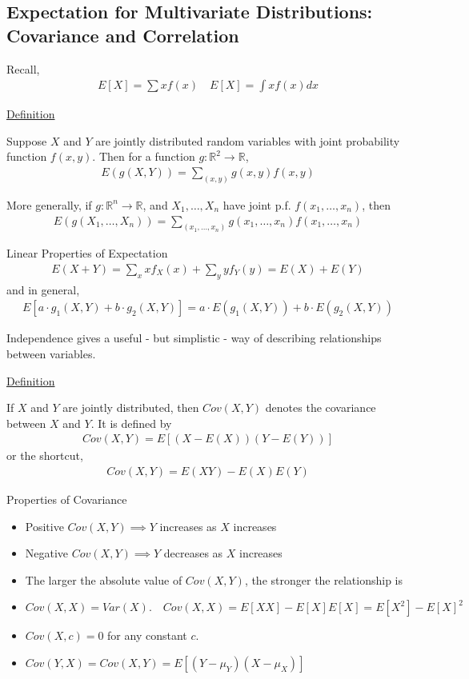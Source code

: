 \documentclass{article}
\begin{document}
\subsection{Expectation for Multivariate Distributions: Covariance and Correlation}

Recall,
\begin{align*}
    E[X] = \sum xf(x) \quad E[X] = \int xf(x)dx
\end{align*}

\underline{Definition}

Suppose $X$ and $Y$ are jointly distributed random variables with joint probability function $f(x,y)$. Then for a function $g: \mathbb{R}^2 \to \mathbb{R}$,
\begin{align*}
    E(g(X,Y)) = \sum_{(x,y)}g(x,y)f(x,y)
\end{align*}

More generally, if $g: \mathbb{R}^n \to \mathbb{R}$, and $X_1, \ldots, X_n$ have joint p.f. $f(x_1, \ldots, x_n)$, then
\begin{align*}
    E(g(X_1, \ldots, X_n)) = \sum_{(x_1, \ldots, x_n)} g(x_1, \ldots, x_n)f(x_1, \ldots, x_n)
\end{align*}


Linear Properties of Expectation
\begin{align*}
    E(X + Y) = \sum_{x}xf_X(x) + \sum_{y}yf_Y(y) = E(X) + E(Y)
\end{align*}
and in general, 
\begin{align*}
    E[a \cdot g_1(X,Y) + b \cdot g_2(X,Y)] = a \cdot E(g_1(X,Y)) + b \cdot E(g_2(X,Y))
\end{align*}

Independence gives a useful - but simplistic - way of describing relationships between variables. 

\underline{Definition}

If $X$ and $Y$ are jointly distributed, then $Cov(X,Y)$ denotes the covariance between $X$ and $Y$. It is defined by
\begin{align*}
    Cov(X,Y) = E[(X-E(X))(Y-E(Y))]
\end{align*}
or the shortcut,
\begin{align*}
    Cov(X,Y) = E(XY) - E(X)E(Y)
\end{align*}

Properties of Covariance
\begin{itemize}
    \item Positive $Cov(X,Y) \implies Y$ increases as $X$ increases
    \item Negative $Cov(X,Y) \implies Y$ decreases as $X$ increases
    \item The larger the absolute value of $Cov(X,Y)$, the stronger the relationship is
    \item $Cov(X,X) = Var(X). \quad Cov(X,X) = E[XX] - E[X]E[X] = E[X^2] - E[X]^2$
    \item $Cov(X,c) = 0$ for any constant $c$.
    \item $Cov(Y,X) = Cov(X,Y) = E[(Y - \mu_Y)(X - \mu_X)]$
\end{itemize}
\end{document}
